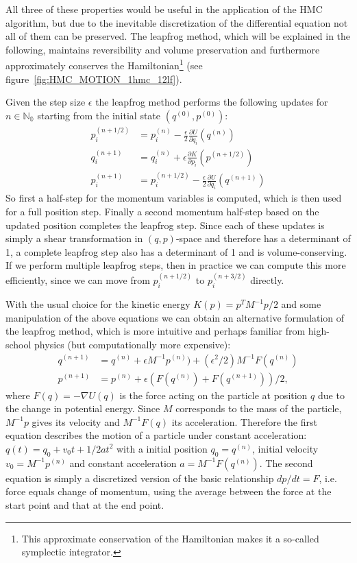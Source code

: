 All three of these properties would be useful in the application of the HMC algorithm, but due to the inevitable discretization of the differential equation not all of them can be preserved. The leapfrog method, which will be explained in the following, maintains reversibility and volume preservation and furthermore approximately conserves the Hamiltonian\footnote{This approximate conservation of the Hamiltonian makes it a so-called symplectic integrator.} (see figure~\ref{fig:HMC_MOTION_1hmc_12lf}).

Given the step size $\epsilon$ the leapfrog method performs the following updates for $n \in \mathbb{N_0}$ starting from the initial state $(q^{(0)}, p^{(0)})$:
\begin{equation}
\begin{split}
p_i^{(n + 1/2)} &= p_i^{(n)} - \frac{\epsilon}{2} \frac{\partial U}{\partial q_i}(q^{(n)}) \\
q_i^{(n + 1)} &= q_i^{(n)} + \epsilon \frac{\partial K}{\partial p_i}(p^{(n + 1/2)}) \\
p_i^{(n + 1)} &= p_i^{(n + 1/2)} - \frac{\epsilon}{2} \frac{\partial U}{\partial q_i}(q^{(n + 1)})
\end{split}
\end{equation}
So first a half-step for the momentum variables is computed, which is then used for a full position step. Finally a second momentum half-step based on the updated position completes the leapfrog step. Since each of these updates is simply a shear transformation in $(q, p)$-space and therefore has a determinant of 1, a complete leapfrog step also has a determinant of 1 and is volume-conserving. If we perform multiple leapfrog steps, then in practice we can compute this more efficiently, since we can move from $p_i^{(n + 1/2)}$ to $p_i^{(n + 3/2)}$ directly.

With the usual choice for the kinetic energy $K(p) = p^T M^{-1} p /2$ and some manipulation of the above equations we can obtain an alternative formulation of the leapfrog method, which is more intuitive and perhaps familiar from high-school physics (but computationally more expensive):
\begin{equation}
\begin{split}
q^{(n + 1)} &= q^{(n)} + \epsilon M^{-1} p^{(n)}) + (\epsilon^2/2) M^{-1} F(q^{(n)}) \\
p^{(n + 1)} &= p^{(n)} + \epsilon (F(q^{(n)}) + F(q^{(n+1)}))/2,
\end{split}
\end{equation}
where $F(q) = - \nabla U(q)$ is the force acting on the particle at position $q$ due to the change in potential energy. Since $M$ corresponds to the mass of the particle, $M^{-1} p$ gives its velocity and $M^{-1} F(q)$ its acceleration. Therefore the first equation describes the motion of a particle under constant acceleration: $q(t) = q_0 + v_0 t + 1/2 a t^2$ with a initial position $q_0 = q^{(n)}$, initial velocity $v_0 = M^{-1} p^{(n)}$ and constant acceleration $a = M^{-1} F(q^{(n)})$. The second equation is simply a discretized version of the basic relationship $dp/dt = F$, i.e. force equals change of momentum, using the average between the force at the start point and that at the end point.

